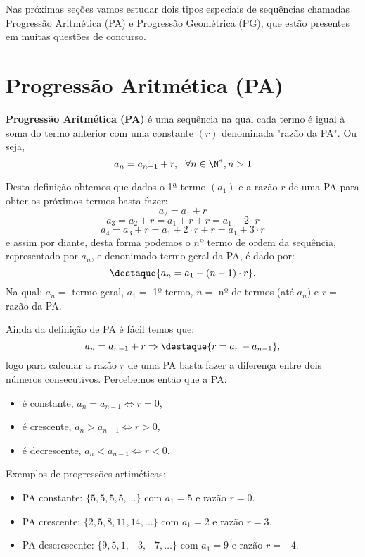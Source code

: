  Nas próximas seções vamos estudar dois tipos especiais de sequências chamadas Progressão Aritmética (PA) e Progressão Geométrica (PG), que estão presentes em muitas questões de concurso.

\section{Progressão Aritmética (PA)}

 \colorbox{azul}{
 \begin{minipage}{0.9\linewidth}
 \begin{center}
  \textbf{Progressão Aritmética (PA)} é uma sequência na qual cada termo é igual à soma do termo anterior com uma constante $(r)$ denominada "razão da PA". Ou seja,
  \[a_{n}= a_{n-1} + r, \ \ \forall n \in \N^{\ast}, n > 1\]
 \end{center}
 \end{minipage}}
 \vskip0.3cm

 Desta definição obtemos que dados o 1ª termo $(a_1)$ e a razão $r$ de uma PA para obter os próximos termos basta fazer:
 \[a_2= a_1 + r\]
 \[a_3= a_2 + r= a_1 + r + r= a_1 + 2 \cdot r\]
 \[a_4= a_3 + r= a_1 + 2 \cdot r + r= a_1 + 3 \cdot r\]
 e assim por diante, desta forma podemos o $nº$ termo de ordem da sequência, representado por $a_n$, e denonimado termo geral da PA, é dado por:
 \[\destaque{a_n= a_1 + (n-1) \cdot r} .\]
 Na qual: $a_n=$ termo geral, $a_1=$ 1º termo, $n=$ nº de termos (até $a_n$) e $r=$ razão da PA.

 Ainda da definição de PA é fácil temos que:
 \[a_{n}= a_{n-1} + r \Rightarrow
 \destaque{r= a_{n} - a_{n-1}} ,\]
 logo para calcular a razão $r$ de uma PA basta fazer a diferença entre dois números consecutivos. Percebemos então que a PA:
 \begin{itemize}
  \item é constante, $a_n= a_{n-1} \Leftrightarrow r= 0$,
  \item é crescente, $a_n > a_{n-1} \Leftrightarrow r > 0$,
  \item é decrescente, $a_n < a_{n-1} \Leftrightarrow r < 0$.
 \end{itemize}

 \begin{exem} Exemplos de progressões artiméticas:
  \begin{itemize}
   \item PA constante: $\{5, 5, 5, 5, \ldots \}$ com $a_1= 5$ e razão $r= 0$.
   \item PA crescente: $\{2, 5, 8, 11, 14, \ldots \}$ com $a_1= 2$ e razão $r= 3$.
   \item PA descrescente: $\{9, 5, 1, -3, -7, \ldots \}$ com $a_1= 9$ e razão $r= -4$.
  \end{itemize}
 \end{exem}

